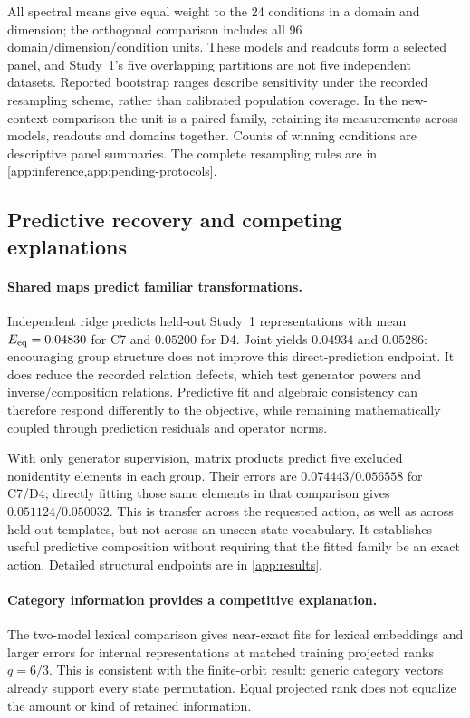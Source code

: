 All spectral means give equal weight to the 24 conditions in a domain and dimension; the orthogonal comparison includes all 96 domain/dimension/condition units. These models and readouts form a selected panel, and Study~1's five overlapping partitions are not five independent datasets. Reported bootstrap ranges describe sensitivity under the recorded resampling scheme, rather than calibrated population coverage. In the new-context comparison the unit is a paired family, retaining its measurements across models, readouts and domains together. Counts of winning conditions are descriptive panel summaries. The complete resampling rules are in \cref{app:inference,app:pending-protocols}.

\subsection{Predictive recovery and competing explanations}
\label{sec:characterization}
\paragraph{Shared maps predict familiar transformations.}
Independent ridge predicts held-out Study~1 representations with mean $E_{\mathrm{eq}}=0.04830$ for C7 and $0.05200$ for D4. Joint yields $0.04934$ and $0.05286$: encouraging group structure does not improve this direct-prediction endpoint. It does reduce the recorded relation defects, which test generator powers and inverse/composition relations. Predictive fit and algebraic consistency can therefore respond differently to the objective, while remaining mathematically coupled through prediction residuals and operator norms.

With only generator supervision, matrix products predict five excluded nonidentity elements in each group. Their errors are $0.074443/0.056558$ for C7/D4; directly fitting those same elements in that comparison gives $0.051124/0.050032$. This is transfer across the requested action, as well as across held-out templates, but not across an unseen state vocabulary. It establishes useful predictive composition without requiring that the fitted family be an exact action. Detailed structural endpoints are in \cref{app:results}.

\paragraph{Category information provides a competitive explanation.}
The two-model lexical comparison gives near-exact fits for lexical embeddings and larger errors for internal representations at matched training projected ranks $q=6/3$. This is consistent with the finite-orbit result: generic category vectors already support every state permutation. Equal projected rank does not equalize the amount or kind of retained information.

